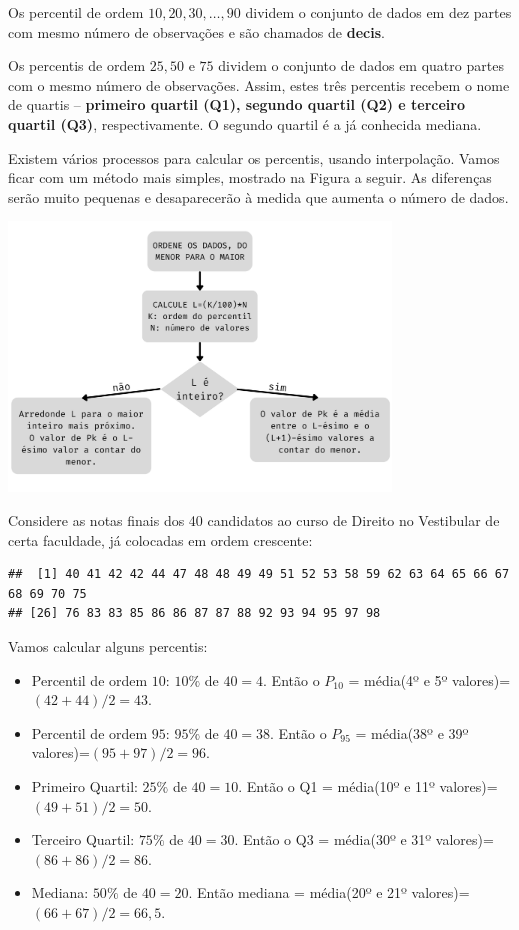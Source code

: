 \documentclass[
]{book}
\begin{document}
Os percentil de ordem \(10,20,30,\ldots,90\) dividem o conjunto de dados em dez partes com mesmo número de observações e são chamados de \textbf{decis}.

Os percentis de ordem \(25,50\) e \(75\) dividem o conjunto de dados em quatro partes com o mesmo número de observações. Assim, estes três percentis recebem o nome de quartis -- \textbf{primeiro quartil (Q1), segundo quartil (Q2) e terceiro quartil (Q3)}, respectivamente. O segundo quartil é a já conhecida mediana.

Existem vários processos para calcular os percentis, usando interpolação. Vamos ficar com um método mais simples, mostrado na Figura a seguir. As diferenças serão muito pequenas e desaparecerão à medida que aumenta o número de dados.

\includegraphics[width=4in]{fluxograma_percentil}

Considere as notas finais dos 40 candidatos ao curso de Direito no Vestibular de certa faculdade, já colocadas em ordem crescente:

\begin{verbatim}
##  [1] 40 41 42 42 44 47 48 48 49 49 51 52 53 58 59 62 63 64 65 66 67 68 69 70 75
## [26] 76 83 83 85 86 86 87 87 88 92 93 94 95 97 98
\end{verbatim}

Vamos calcular alguns percentis:

\begin{itemize}
\item
  Percentil de ordem \(10\): \(10\%\) de \(40=4\). Então o \(P_10\) = média(4º e 5º valores)=\((42+44)/2=43\).
\item
  Percentil de ordem \(95\): \(95\%\) de \(40=38\). Então o \(P_95\) = média(38º e 39º valores)=\((95+97)/2=96\).
\item
  Primeiro Quartil: \(25\%\) de \(40=10\). Então o Q1 = média(10º e 11º valores)=\((49+51)/2 = 50\).
\item
  Terceiro Quartil: \(75\%\) de \(40=30\). Então o Q3 = média(30º e 31º valores)=\((86+86)/2 = 86\).
\item
  Mediana: \(50\%\) de \(40=20\). Então mediana = média(20º e 21º valores)=\((66+67)/2 = 66,5\).
\end{itemize}
\end{document}
